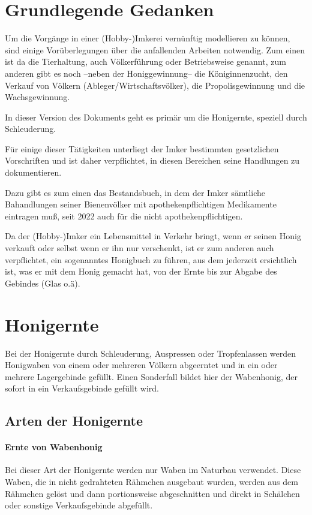 \section{Grundlegende Gedanken}

Um die Vorgänge in einer (Hobby-)Imkerei vernünftig modellieren zu können, sind
einige Vorüberlegungen über die anfallenden Arbeiten notwendig. Zum einen ist da
die Tierhaltung, auch Völkerführung oder Betriebsweise genannt, zum anderen gibt
es noch --neben der Honiggewinnung-- die Königinnenzucht, den Verkauf von
Völkern (Ableger/Wirtschaftsvölker), die Propolisgewinnung und die
Wachsgewinnung. \bigskip

In dieser Version des Dokuments geht es primär um die Honigernte, speziell durch
Schleuderung\bigskip.

Für einige dieser Tätigkeiten unterliegt der Imker bestimmten gesetzlichen
Vorschriften und ist daher verpflichtet, in diesen Bereichen seine Handlungen zu
dokumentieren.\medskip

Dazu gibt es zum einen das Bestandsbuch, in dem der Imker sämtliche Bahandlungen
seiner Bienenvölker mit apothekenpflichtigen Medikamente eintragen muß, seit
2022 auch für die nicht apothekenpflichtigen. \medskip


Da der (Hobby-)Imker ein Lebensmittel in Verkehr bringt, wenn er seinen Honig verkauft oder selbst wenn er ihn nur
verschenkt, ist er zum anderen auch verpflichtet, ein sogenanntes Honigbuch zu führen, aus dem
jederzeit ersichtlich ist, was er mit dem Honig gemacht hat, von der Ernte bis
zur Abgabe des Gebindes (Glas o.ä). \bigskip

\section{Honigernte}
Bei der Honigernte durch Schleuderung, Auspressen oder Tropfenlassen werden
Honigwaben von einem oder mehreren Völkern abgeerntet und in ein oder mehrere
Lagergebinde gefüllt. Einen Sonderfall bildet hier der Wabenhonig, der sofort in ein Verkaufsgebinde gefüllt wird.

\subsection {Arten der Honigernte}
\paragraph{Ernte von Wabenhonig}
Bei dieser Art der Honigernte werden nur Waben im Naturbau verwendet. Diese
Waben, die in nicht gedrahteten Rähmchen ausgebaut wurden, werden aus dem
Rähmchen gelöst und dann portionsweise abgeschnitten und direkt in Schälchen
oder sonstige Verkaufsgebinde abgefüllt.
